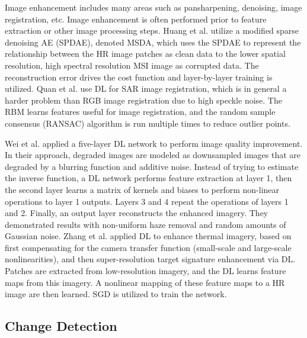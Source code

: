 \documentclass[12pt]{spieman}
\begin{document}
\begin{spacing}{1}
Image enhancement includes many areas such as pansharpening, denoising, image registration, etc. Image enhancement is often performed prior to feature extraction or other image processing steps. Huang et al. \cite{huang2015new} utilize a modified sparse denoising AE (SPDAE), denoted MSDA, which uses the SPDAE to represent the relationship between the HR image patches as clean data to the lower spatial resolution, high spectral resolution MSI image as corrupted data. The reconstruction error drives the cost function and layer-by-layer training is utilized. Quan et al. \cite{Quan2016Using} use DL for SAR image registration, which is in general a harder problem than RGB image registration due to high speckle noise. The RBM learns features useful for image registration, and the random sample consensus (RANSAC) algorithm is run multiple times to reduce outlier points. 

Wei et al. \cite{Wei2016Universal} applied a five-layer DL network to perform image quality improvement. In their approach, degraded images are modeled as downsampled images that are degraded by a blurring function and additive noise. Instead of trying to estimate the inverse function, a DL network performs feature extraction at layer 1, then the second layer learns a matrix of kernels and biases to perform non-linear operations to layer 1 outputs. Layers 3 and 4 repeat the operations of layers 1 and 2. Finally, an output layer reconstructs the enhanced imagery. They demonstrated results with non-uniform haze removal and random amounts of Gaussian noise. Zhang et al. \cite{zhang2016systematic} applied DL to enhance thermal imagery, based on first compensating for the camera transfer function (small-scale and large-scale nonlinearities), and then super-resolution target signature enhancement via DL. Patches are extracted from low-resolution imagery, and the DL learns feature maps from this imagery. A nonlinear mapping of these feature maps to a HR image are then learned. SGD is utilized to train the network.

\subsection{Change Detection}


\end{spacing}
\end{document}
